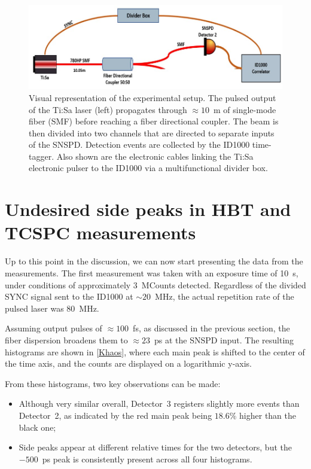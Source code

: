 \begin{figure}[hbtp]
\centering
\includegraphics[width=1\textwidth]{TiSa_Setup.jpg}
\caption{Visual representation of the experimental setup. The pulsed output of the Ti:Sa laser (left) propagates through $\approx 10$~m of single-mode fiber (SMF) before reaching a fiber directional coupler. The beam is then divided into two channels that are directed to separate inputs of the SNSPD. Detection events are collected by the ID1000 time-tagger. Also shown are the electronic cables linking the Ti:Sa electronic pulser to the ID1000 via a multifunctional divider box.}
\label{TisaSetup}
\end{figure}




\section{Undesired side peaks in HBT and TCSPC measurements}
\label{cpp:Initial-khaos}
Up to this point in the discussion, we can now start presenting the data from the measurements.  
The first measurement was taken with an exposure time of 10~s, under conditions of approximately 3~MCounts detected. Regardless of the divided SYNC signal sent to the ID1000 at $\sim 20$~MHz, the actual repetition rate of the pulsed laser was 80~MHz.  

Assuming output pulses of $\approx 100$~fs, as discussed in the previous section, the fiber dispersion broadens them to $\approx 23$~ps at the SNSPD input. The resulting histograms are shown in \autoref{Khaos}, where each main peak is shifted to the center of the time axis, and the counts are displayed on a logarithmic y-axis.  

From these histograms, two key observations can be made:  
\begin{itemize}
	\item Although very similar overall, Detector~3 registers slightly more events than Detector~2, as indicated by the red main peak being $18.6\%$ higher than the black one;
	\item Side peaks appear at different relative times for the two detectors, but the $-500$~ps peak is consistently present across all four histograms.
\end{itemize}

